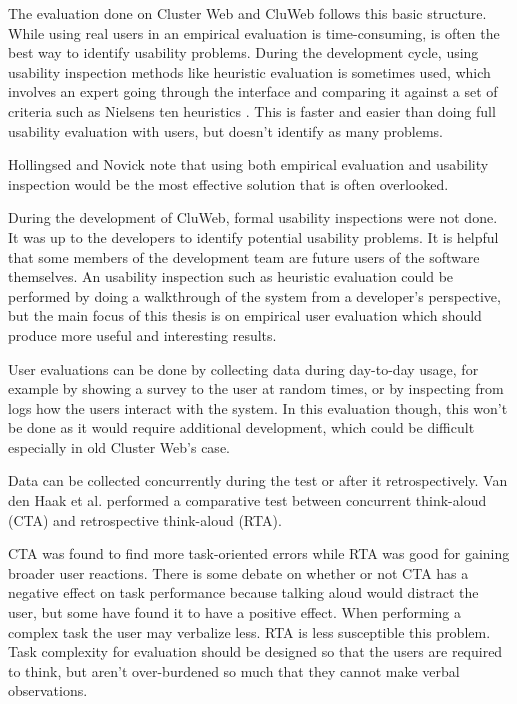 \cite{rubin2008handbook}

The evaluation done on Cluster Web and CluWeb follows this basic structure. While using real users in an empirical evaluation is time-consuming, is often the best way to identify usability problems. During the development cycle, using usability inspection methods like heuristic evaluation is sometimes used, which involves an expert going through the interface and comparing it against a set of criteria such as Nielsens ten heuristics \cite{Solr-oula.410573, nielsen1995usability}. This is faster and easier than doing full usability evaluation with users, but doesn't identify as many problems.

Hollingsed and Novick note that using both empirical evaluation and usability inspection would be the most effective solution that is often overlooked. \cite{hollingsed2007usability}

During the development of CluWeb, formal usability inspections were not done. It was up to the developers to identify potential usability problems. It is helpful that some members of the development team are future users of the software themselves. An usability inspection such as heuristic evaluation could be performed by doing a walkthrough of the system from a developer's perspective, but the main focus of this thesis is on empirical user evaluation which should produce more useful and interesting results.

User evaluations can be done by collecting data during day-to-day usage, for example by showing a survey to the user at random times, or by inspecting from logs how the users interact with the system. \cite{bevanevaluation} In this evaluation though, this won't be done as it would require additional development, which could be difficult especially in old Cluster Web's case.

Data can be collected concurrently during the test or after it retrospectively. Van den Haak et al. performed a comparative test between concurrent think-aloud (CTA) and retrospective think-aloud (RTA).

CTA was found to find more task-oriented errors while RTA was good for gaining broader user reactions. There is some debate on whether or not CTA has a negative effect on task performance because talking aloud would distract the user, but some have found it to have a positive effect. When performing a complex task the user may verbalize less. RTA is less susceptible this problem. Task complexity for evaluation should be designed so that the users are required to think, but aren't over-burdened so much that they cannot make verbal observations.
\cite{van2003retrospective}

